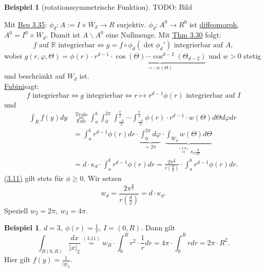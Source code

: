 \documentclass[a4paper]{report}
\newcommand{\R}{\mathbb{R}}
\newcommand{\jlabel}[1]{\label{j_#1}}
\newcommand{\jshortlink}[1]{\jhyperref{#1}{\text{#1}}}
\newcommand{\jhyperref}[2]{\hyperref[j_#1]{#2}}
\newcommand{\jlink}[1]{\jhyperref{#1}{#1}}
\newcommand{\jabb}[3]{ #1: #2 \rightarrow #3 }
\newcommand{\jlinkFubini}{\jhyperref{Fubini}{Fubini}}
\newcommand{\jshortlinkFubini}{\jhyperref{Fubini}{\text{Fub}}}
\newcommand{\jspace}{\vspace{8pt}}
\theoremstyle{plain}
\theoremstyle{definition}
\newtheorem{expl}[thm]{Beispiel}
\newtheorem*{expl*}{Beispiel}
\begin{document}
{{{{\begin{expl}[rotationssymmetrische Funktion]
    \jspace
    
    TODO: Bild
    
    \jspace
    
    Mit \jlink{Bsp 3.35}: $\jabb{\phi_d}{A:= I\times \overline{W}_d}{R}$ surjektiv. $\jabb{\phi_d}{A^0}{R^0}$ ist \jlink{diffeomorph}, $A^0 = I^0\times W_d$. Damit ist $A\backslash A^0$ eine Nullmenge. Mit \jlink{Thm 3.30} folgt:
    \[
        f\text{ auf }\R\text{ integrierbar} \Leftrightarrow g = f \circ \phi_d(\det \phi_d')\text{ integrierbar auf } A,
    \]
    wobei $g(r,\varphi, \Theta) = \phi(r)\cdot r^{d-1}\cdot \underbrace{\cos(\Theta)\cdots \cos^{d-2}(\Theta_{d-2})}_{=: w(\Theta)}$ und $w>0$ stetig und beschränkt auf $W_d$ ist.\\
    \jlinkFubini sagt:
    \[
        f \text{ integrierbar} \Leftrightarrow g \text{ integrierbar} \Leftrightarrow r\mapsto r^{d-1}\phi(r) \text{ integrierbar auf } I
    \]
    und
    \begin{equation}
        \jlabel{(3.11)}
        \begin{split}
            \int_R f(y)dy &\overset{\jshortlink{Trafo}}{\underset{\jshortlinkFubini}{=}} \int_a^b \int_0^{2\pi} \int_\frac{-\pi}{2}^\frac{\pi}{2}\cdots\int_\frac{-\pi}{2}^\frac{\pi}{2} \phi(r)\cdot r^{d-1}\cdot w(\Theta)d\Theta d\varphi dr\\
                          &=\int_a^b r^{d-1}\phi(r)dr \cdot \underbrace{\int_0^{2\pi}d\varphi}_{=2\pi} \cdot \underbrace{\int_{W_d} w(\Theta) d\Theta}_{\overset{\jlink{(3.9)}}{=} \kappa_d \frac{d}{2\pi}}\\
                          &=d\cdot \kappa_d \cdot \int_a^b r^{d-1}\phi(r) dr = \frac{2\pi^{\frac{d}{2}}}{r(\frac{d}{2})}\cdot \int_a^br^{d-1}\phi(r)dr.
        \end{split}
    \end{equation}
    \jlink{(3.11)} gilt stets für $\phi \ge 0$. Wir setzen
    \begin{equation}
        \jlabel{(3.12)}
        w_d = \frac{2\pi^\frac{d}{2}}{r(\frac{d}{2})} = d\cdot \kappa_d.
    \end{equation}
    Speziell $w_2 = 2\pi,\ w_3 = 4\pi$.
    
    \begin{expl*}
        $d=3, \ \phi(r) = \frac{1}{r}, \ I=(0,R)$. Dann gilt
        \[
            \int_{B(0,R)} \frac{dx}{|x|_2} \overset{(3.11)}{=} w_B\cdot \int_0^R r^2\cdot \frac{1}{r}dr = 4\pi\cdot \int_0^R r dr = 2\pi\cdot R^2.
        \]
        Hier gilt $f(y) = \frac{1}{|y|_2}$.
    \end{expl*}
\end{expl}

}}}}
\end{document}
